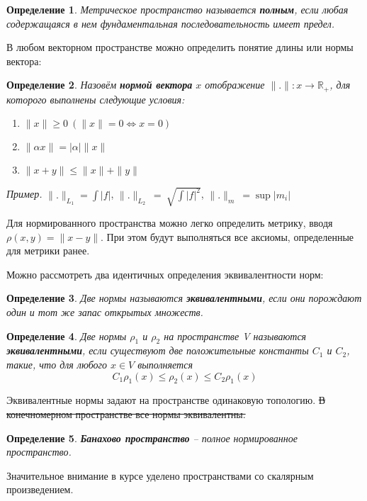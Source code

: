 \documentclass[12pt]{article}
\newcommand{\example}{{\itshape Пример. }}
\newcommand{\equals}{\Leftrightarrow}
\renewcommand{\leq}{\leqslant}
\renewcommand{\geq}{\geqslant}
\newtheorem{defi}{Определение}[section]
\begin{document}
	\begin{defi}
		Метрическое пространство называется \textbf{полным}, если любая содержащаяся в нем фундаментальная последовательность имеет 
		предел.
	\end{defi}
	
	В любом векторном пространстве можно определить понятие длины или нормы вектора:
	
	\begin{defi}
		Назовём \textbf{нормой вектора} $x$ отображение $\|.\| : x \rightarrow \mathbb{R_+}$, для которого выполнены следующие условия:
		\begin{enumerate}
			\item $\|x\| \geq 0 ~(\|x\| = 0 \equals x = 0)$
			\item $\|\alpha x\| = |\alpha| \|x\|$
			\item $\|x + y\| \leq \|x\| + \|y\|$
		\end{enumerate}
	\end{defi}
	
	\example $\|.\|_{L_1} = \int {|f|}$, $\|.\|_{L_2} ~=~ \sqrt{\int {|f|^2}}$,  $\|.\|_{m} ~= \sup {|m_i|}$
	
	Для нормированного пространства можно легко определить метрику, вводя $\rho(x,y) = \|x-y\|$. При этом будут выполняться все аксиомы,
	определенные для метрики ранее.
	
	Можно рассмотреть два идентичных определения эквивалентности норм:
	
	\begin{defi}
		Две нормы называются \textbf{эквивалентными}, если они порождают один и тот же запас открытых множеств.
	\end{defi}
	
	\begin{defi}
		Две нормы $\rho_1$ и $\rho_2$ на пространстве V называются \textbf{эквивалентными}, если существуют две положительные константы 
		$C_1$ и $C_2$, такие, что для любого $x \in V$ выполняется 
		$$C_1 \rho_1(x) \leq \rho_2(x) \leq C_2 \rho_1(x)$$
	\end{defi}
	Эквивалентные нормы задают на пространстве одинаковую топологию. \sout{В конечномерном пространстве все нормы эквивалентны.}
	
	\begin{defi}
		\textbf{Банахово пространство} -- полное нормированное пространство.
	\end{defi}

	Значительное внимание в курсе уделено пространствами со скалярным произведением.
\end{document}
